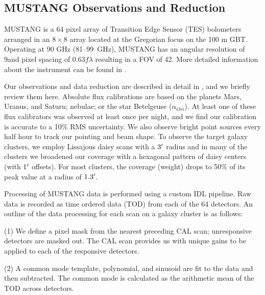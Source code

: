 \documentclass[iop,numberedappendix,apj]{emulateapj}
\begin{document}


\subsection{MUSTANG Observations and Reduction}
\label{sec:musobs}

MUSTANG is a 64 pixel array of Transition Edge Sensor (TES) bolometers arranged in an $8 \times 8$ array
located at the Gregorian focus on the 100 m GBT. Operating at 90 GHz (81--99~GHz),
MUSTANG has an angular resolution of 9\asec and pixel spacing of 0.63$f \lambda$ resulting in a FOV
of 42\asec. More detailed information about the instrument can be found in \citet{dicker2008}.

Our observations and data reduction are described in detail in \citet{romero2015a}, and we briefly review them
here. Absolute flux calibrations are based on the planets Mars, Uranus, and Saturn; nebulae; or the star Betelgeuse 
($\alpha_{Ori}$). At least one of these flux calibrators was observed at least once per night, and we find our 
calibration is accurate to a 10\% RMS uncertainty. We also observe bright point sources every half hour
to track our pointing and beam shape. To observe the target galaxy clusters, we employ Lissajous daisy scans 
with a $3\mbox{$^\prime$}$ radius and in many of the clusters we broadened our coverage with a hexagonal pattern of 
daisy centers (with $1\mbox{$^\prime$}$ offsets). 
For most clusters, the coverage (weight) drops to 50\% of its peak value at a radius of $1.3\mbox{$^\prime$}$.

Processing of MUSTANG data is performed using a custom IDL pipeline. Raw data is recorded as time ordered data (TOD)
from each of the 64 detectors. An outline of the data processing for each scan on a galaxy cluster is as follows:
  
  (1) We define a pixel mask from the nearest preceding CAL scan; unresponsive detectors are masked out.
  The CAL scan provides us with unique gains to be applied to each of the responsive detectors.

  (2) A common mode template, polynomial, and sinusoid are fit to the data and then subtracted. The common mode is
  calculated as the arithmetic mean of the TOD across detectors.
\end{document}
